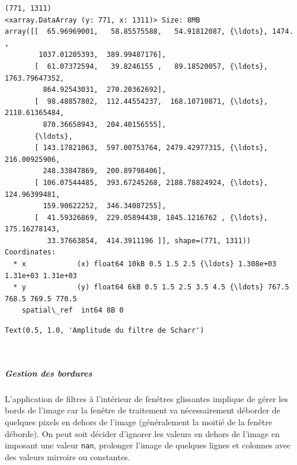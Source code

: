 \documentclass[11pt]{article}
\makeatletter
\newcommand{\boxspacing}{\kern\kvtcb@left@rule\kern\kvtcb@boxsep}
\newcommand{\prompt}[4]{
        {\ttfamily\llap{{\color{#2}[#3]:\hspace{3pt}#4}}\vspace{-\baselineskip}}
    }
\makeatother
\begin{document}
    \begin{Verbatim}[commandchars=\\\{\}]
(771, 1311)
<xarray.DataArray (y: 771, x: 1311)> Size: 8MB
array([[  65.96969001,   58.85575588,   54.91812087, {\ldots}, 1474.        ,
        1037.01205393,  389.99487176],
       [  61.07372594,   39.8246155 ,   89.18520057, {\ldots}, 1763.79647352,
         864.92543031,  270.20362692],
       [  98.48857802,  112.44554237,  168.10710871, {\ldots}, 2110.61365484,
         870.36658943,  204.40156555],
       {\ldots},
       [ 143.17821063,  597.00753764, 2479.42977315, {\ldots},  216.00925906,
         248.33847869,  200.89798406],
       [ 106.07544485,  393.67245268, 2188.78824924, {\ldots},  124.96399481,
         159.90622252,  346.34087255],
       [  41.59326869,  229.05894438, 1845.1216762 , {\ldots},  175.16278143,
          33.37663854,  414.3911196 ]], shape=(771, 1311))
Coordinates:
  * x            (x) float64 10kB 0.5 1.5 2.5 {\ldots} 1.308e+03 1.31e+03 1.31e+03
  * y            (y) float64 6kB 0.5 1.5 2.5 3.5 4.5 {\ldots} 767.5 768.5 769.5 770.5
    spatial\_ref  int64 8B 0
    \end{Verbatim}

            \begin{tcolorbox}[breakable, size=fbox, boxrule=.5pt, pad at break*=1mm, opacityfill=0]
\prompt{Out}{outcolor}{12}{\boxspacing}
\begin{Verbatim}[commandchars=\\\{\}]
Text(0.5, 1.0, 'Amplitude du filtre de Scharr')
\end{Verbatim}
\end{tcolorbox}
        
    \begin{center}
    \end{center}
    { \hspace*{\fill} \\}
    
    \hypertarget{gestion-des-bordures}{%
\subparagraph{Gestion des bordures}\label{gestion-des-bordures}}

L'application de filtres à l'intérieur de fenêtres glissantes implique
de gérer les bords de l'image car la fenêtre de traitement va
nécessairement déborder de quelques pixels en dehors de l'image
(généralement la moitié de la fenêtre déborde). On peut soit décider
d'ignorer les valeurs en dehors de l'image en imposant une valeur
\texttt{nan}, prolonger l'image de quelques lignes et colonnes avec des
valeurs mirroirs ou constantes.
\end{document}
